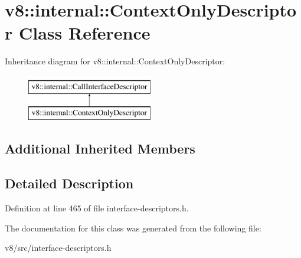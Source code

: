 \hypertarget{classv8_1_1internal_1_1ContextOnlyDescriptor}{}\section{v8\+:\+:internal\+:\+:Context\+Only\+Descriptor Class Reference}
\label{classv8_1_1internal_1_1ContextOnlyDescriptor}
Inheritance diagram for v8\+:\+:internal\+:\+:Context\+Only\+Descriptor\+:\begin{figure}[H]
\begin{center}
\leavevmode
\includegraphics[height=2.000000cm]{classv8_1_1internal_1_1ContextOnlyDescriptor}
\end{center}
\end{figure}
\subsection*{Additional Inherited Members}


\subsection{Detailed Description}


Definition at line 465 of file interface-\/descriptors.\+h.



The documentation for this class was generated from the following file\+:\begin{DoxyCompactItemize}
\item 
v8/src/interface-\/descriptors.\+h\end{DoxyCompactItemize}
